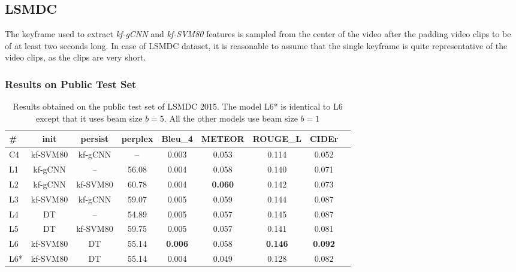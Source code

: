 \subsection{LSMDC}
The keyframe used to extract \emph{kf-gCNN} and \emph{kf-SVM80} features is
sampled from the center of the video after the padding video clips to be of at
least two seconds long.
In case of LSMDC dataset, it is reasonable to assume that the single keyframe is
quite representative of the video clips, as the clips are very short.

\subsubsection{Results on Public Test Set}
\begin{table}[t]
  \newcommand{\modpar}[4]{%
    \multirow{2}{*}{\emph{#1}} & \multirow{2}{*}{#2} & \multirow{2}{*}{#3}
    & \multirow{2}{*}{#4}}
  \newcommand{\bs}{\bf \small}
  \centering
  \begin{adjustbox}{center}
    \begin{tabular}{|l|c|c|c|c|c|c|c|c|}
        \hline\hline
        \bs \#   &\bs init &\bs persist &\bs perplex&\bs Bleu\_4&\bs METEOR &\bs ROUGE\_L &\bs CIDEr  \\\hline\hline
        C4   & kf-SVM80 & kf-gCNN  &  --   & 0.003   &   0.053 &   0.114&   0.052 \\\hline
        L1   & kf-gCNN  & --    & 56.08 & 0.004   &   0.058 &   0.140&   0.071 \\
        L2   & kf-gCNN  & kf-SVM80 & 60.78 & 0.004   &\bf0.060 &   0.142&   0.073 \\
        L3   & kf-SVM80 & kf-gCNN  & 59.07 & 0.005   &   0.059 &   0.144&   0.087 \\\hline
        L4   & DT    & --    & 54.89 & 0.005   &   0.057 &   0.145&   0.087 \\
        L5   & DT    & kf-SVM80 & 59.75 & 0.005   &   0.057 &   0.141&   0.081 \\
        L6   & kf-SVM80 & DT    & 55.14 &\bf0.006 &   0.058 &\bf0.146&\bf0.092 \\
        L6*  & kf-SVM80 & DT    & 55.14 &   0.004 &   0.049 &   0.128 &   0.082 \\\hline 
    \end{tabular}
  \end{adjustbox}
    \caption{Results obtained on the public test set of LSMDC 2015. The model
    L6* is identical to L6 except that it uses beam size $b=5$. All the other
    models use beam size $b=1$}
    \label{tab:resLsmdcVal}
\end{table}

